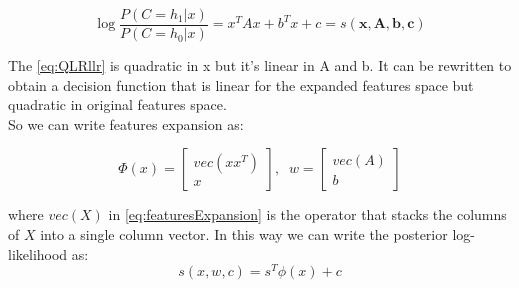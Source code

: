 \begin{equation}
    \log{\frac{P(C=h_1|x)}{P(C=h_0|x)}}=x^TAx+b^Tx+c=s(\textbf{x},\textbf{A},\textbf{b},\textbf{c})
    \label{eq:QLRllr}
\end{equation}

The \autoref{eq:QLRllr} is quadratic in x but it's linear in A and b.
It can be rewritten to obtain a decision function that is linear for the expanded features space but quadratic in original features space.\\
So we can write features expansion as:

\begin{equation}
    \Phi(x)=
    \begin{bmatrix}
        vec(xx^T) \\
        x
    \end{bmatrix},
    \;\;
    w=
    \begin{bmatrix}
        vec(A) \\
        b
    \end{bmatrix}
    \label{eq:featuresExpansion}
\end{equation}

where \(vec(X)\) in \autoref{eq:featuresExpansion} is the operator that stacks the columns of \(X\) into a single column vector.
In this way we can write the posterior log-likelihood as:
\begin{equation}
    s(x,w,c)=s^T\phi(x)+c
\end{equation}

